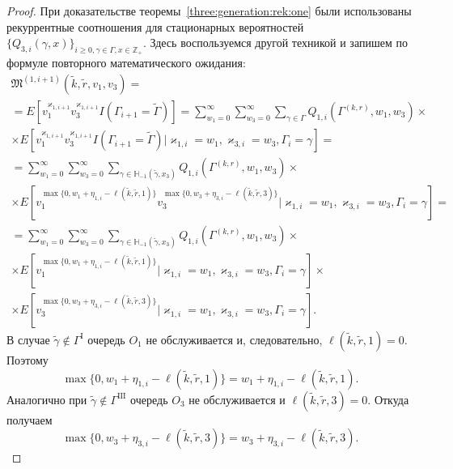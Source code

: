 \begin{proof}
При доказательстве теоремы~\ref{three:generation:rek:one}  были использованы рекуррентные соотношения для стационарных вероятностей~$\{Q_{3, i}(\gamma, x)\}_{i\geqslant 0, \gamma \in \Gamma, x \in {\mathbb Z}_+}$. Здесь воспользуемся другой техникой и запишем по формуле повторного математического ожидания:
\begin{multline}
\mathfrak{M}^{(1, i+1)}(\tilde{k}, \tilde{r}, v_1, v_3) =\\
= E[v_1^{\varkappa_{1, i+1}}v_3^{\varkappa_{1, i+1}}I(\Gamma_{i+1}=\tilde{\Gamma})] =
\sum_{w_1=0}^{\infty}\sum_{w_3=0}^{\infty} \sum_{\gamma \in \Gamma} Q_{1, i}(\Gamma^{(k, r)}, w_1, w_3) \times \\
\times
E[v_1^{\varkappa_{1, i+1}}v_3^{\varkappa_{1, i+1}}I(\Gamma_{i+1}=\tilde{\Gamma}) | \varkappa_{1, i}=w_1, \varkappa_{3, i}=w_3,  \Gamma_i=\gamma] = \\ =
\sum_{w_1=0}^{\infty}\sum_{w_3=0}^{\infty} \sum_{\gamma \in {\mathbb H}_{-1}(\tilde{\gamma}, x_3)} Q_{1, i}(\Gamma^{(k, r)}, w_1, w_3) 
\times \\ \times E[v_1^{\max{\{0,  w_1 + \eta_{1, i} - \ell(\tilde{k}, \tilde{r}, 1)\}}} v_3^{\max{\{0,  w_3 + \eta_{3, i} - \ell(\tilde{k}, \tilde{r}, 3)\}}} | \varkappa_{1, i}=w_1, \varkappa_{3, i}=w_3,  \Gamma_i=\gamma] = \\ =
\sum_{w_1=0}^{\infty}\sum_{w_3=0}^{\infty} \sum_{\gamma \in {\mathbb H}_{-1}(\tilde{\gamma}, x_3)} Q_{1, i}(\Gamma^{(k, r)}, w_1, w_3) 
\times \\ \times E[v_1^{\max{\{0,  w_1 + \eta_{1, i} - \ell(\tilde{k}, \tilde{r}, 1)\}}} | \varkappa_{1, i}=w_1, \varkappa_{3, i}=w_3,  \Gamma_i=\gamma] \times \\ \times E[ v_3^{\max{\{0,  w_3 + \eta_{3, i} - \ell(\tilde{k}, \tilde{r}, 3)\}}} | \varkappa_{1, i}=w_1, \varkappa_{3, i}=w_3,  \Gamma_i=\gamma].
\label{second:try:gen}
\end{multline}
В случае $\tilde{\gamma}\not\in \Gamma^{\mathrm{I}}$ очередь $O_1$ не обслуживается и,  следовательно,  $\ell(\tilde{k}, \tilde{r}, 1)=0$. Поэтому
$$
\max{\{0,  w_1 + \eta_{1, i} - \ell(\tilde{k}, \tilde{r}, 1)\}} = w_1 + \eta_{1, i} - \ell(\tilde{k}, \tilde{r}, 1).
$$
Аналогично при $\tilde{\gamma}\not\in \Gamma^{\mathrm{III}}$ очередь $O_3$ не обслуживается и $\ell(\tilde{k}, \tilde{r}, 3)=0$. Откуда получаем 
$$
\max{\{0,  w_3 + \eta_{3, i} - \ell(\tilde{k}, \tilde{r}, 3)\}} = w_3 + \eta_{3, i} - \ell(\tilde{k}, \tilde{r}, 3).
$$


\end{proof}
